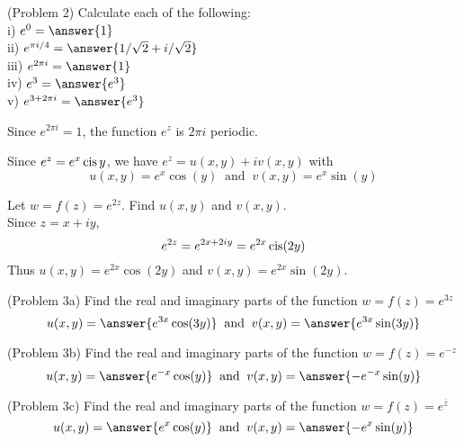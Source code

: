 \documentclass[handout]{ximera}
\begin{document}
\begin{problem}(Problem 2)
Calculate each of the following:\\
i) $e^0 = \answer{1}$\\
ii) $e^{\pi i /4} = \answer{1/\sqrt 2 + i/\sqrt 2}$\\
iii) $e^{2\pi i}= \answer{1}$\\
iv) $e^3 = \answer{e^3}$\\
v) $e^{3+2\pi i} = \answer{e^3}$\\
\end{problem} 

\begin{remark}
Since $e^{2\pi i} = 1$, the function $e^z$ is $2\pi i$ periodic.
\end{remark}

Since $e^z = e^x \operatorname{cis} y$, we have $e^z = u(x,y) + iv(x,y)$ with
\[
u(x,y) = e^x\cos(y) \;\; \mbox{and} \;\; v(x,y)= e^x\sin(y)
\]




\begin{example}[Example 3] 
Let $w = f(z) = e^{2z}$. Find $u(x,y)$ and $v(x,y)$.\\
Since $z = x+iy$, 
\[
e^{2z} = e^{2x+2iy} = e^{2x}\operatorname{cis}(2y)
\]
Thus $u(x,y) = e^{2x}\cos(2y)$ and $v(x,y) = e^{2x}\sin(2y)$.

\end{example}



\begin{problem}(Problem 3a)
Find the real and imaginary parts of the function $w = f(z) = e^{3z}$
\[
u(x,y) = \answer{e^{3x}\cos(3y)} \;\; \mbox{and} \;\; v(x,y) = \answer{e^{3x}\sin(3y)}
\]

\end{problem}

\begin{problem}(Problem 3b)
Find the real and imaginary parts of the function $w = f(z) = e^{-z}$
\[
u(x,y) = \answer{e^{-x}\cos(y)} \;\; \mbox{and} \;\; v(x,y) = \answer{-e^{-x}\sin(y)}
\]

\end{problem}

\begin{problem}(Problem 3c)
Find the real and imaginary parts of the function $w = f(z) = e^{\overline{z}}$
\[
u(x,y) = \answer{e^x\cos(y)} \;\; \mbox{and} \;\; v(x,y) = \answer{-e^x\sin(y)}
\]
\end{problem}
\end{document}
